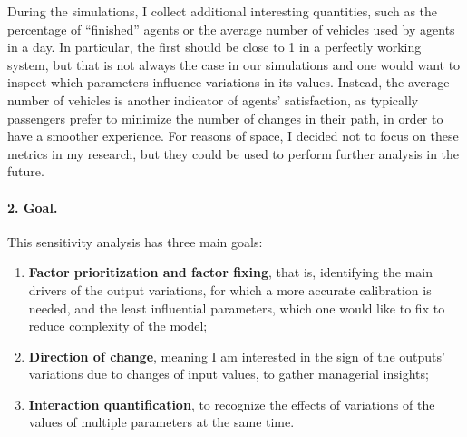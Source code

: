 During the simulations, I collect additional interesting quantities, such as the percentage of “finished” agents or the average number of vehicles used by agents in a day. In particular, the first should be close to 1 in a perfectly working system, but that is not always the case in our simulations and one would want to inspect which parameters influence variations in its values. Instead, the average number of vehicles is another indicator of agents' satisfaction, as typically passengers prefer to minimize the number of changes in their path, in order to have a smoother experience. For reasons of space, I decided not to focus on these metrics in my research, but they could be used to perform further analysis in the future.


\paragraph{2. Goal.}
This sensitivity analysis has three main goals:
\begin{enumerate}
    \item \textbf{Factor prioritization and factor fixing}, that is, identifying the main drivers of the output variations, for which a more accurate calibration is needed, and the least influential parameters, which one would like to fix to reduce complexity of the model;
    \item \textbf{Direction of change}, meaning I am interested in the sign of the outputs' variations due to changes of input values, to gather managerial insights;
    \item \textbf{Interaction quantification}, to recognize the effects of variations of the values of multiple parameters at the same time. 
\end{enumerate}


